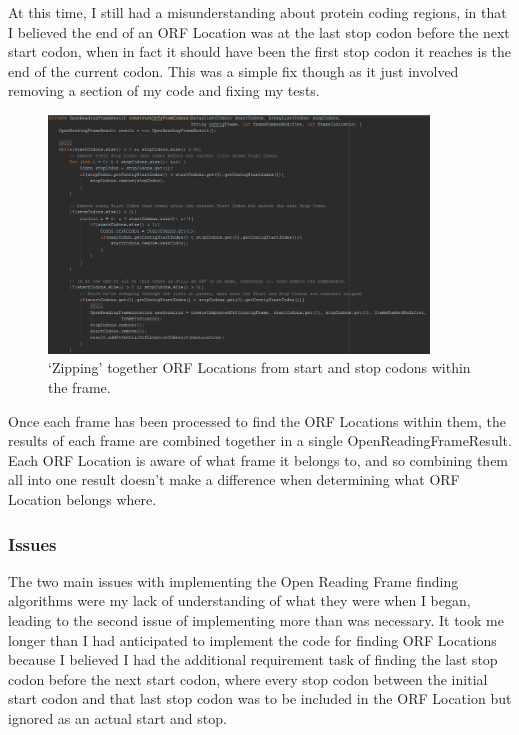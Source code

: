 At this time, I still had a misunderstanding about protein coding regions, in that I believed the end of an ORF Location was at the last stop codon before the next start codon, when in fact it should have been the first stop codon it reaches is the end of the current codon. This was a simple fix though as it just involved removing a section of my code and fixing my tests.

\begin{figure}[H]
\centering
\includegraphics[width=0.9\textwidth]{images/orffind3}
\caption{`Zipping' together ORF Locations from start and stop codons within the frame.}
\end{figure}

Once each frame has been processed to find the ORF Locations within them, the results of each frame are combined together in a single OpenReadingFrameResult. Each ORF Location is aware of what frame it belongs to, and so combining them all into one result doesn't make a difference when determining what ORF Location belongs where.

\subsubsection{Issues}
The two main issues with implementing the Open Reading Frame finding algorithms were my lack of understanding of what they were when I began, leading to the second issue of implementing more than was necessary. It took me longer than I had anticipated to implement the code for finding ORF Locations because I believed I had the additional requirement task of finding the last stop codon before the next start codon, where every stop codon between the initial start codon and that last stop codon was to be included in the ORF Location but ignored as an actual start and stop.

